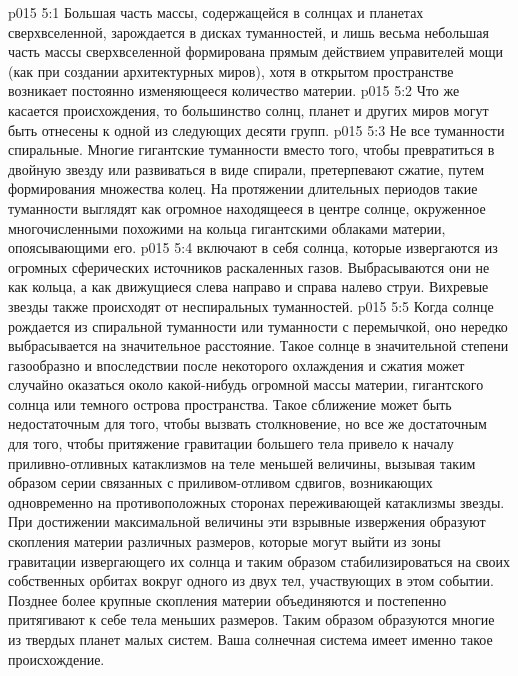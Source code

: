 \vs p015 5:1 Большая часть массы, содержащейся в солнцах и планетах сверхвселенной, зарождается в дисках туманностей, и лишь весьма небольшая часть массы сверхвселенной формирована прямым действием управителей мощи (как при создании архитектурных миров), хотя в открытом пространстве возникает постоянно изменяющееся количество материи.
\vs p015 5:2 Что же касается происхождения, то большинство солнц, планет и других миров могут быть отнесены к одной из следующих десяти групп.
\vs p015 5:3 \bibnobreakspace {} Не все туманности спиральные. Многие гигантские туманности вместо того, чтобы превратиться в двойную звезду или развиваться в виде спирали, претерпевают сжатие, путем формирования множества колец. На протяжении длительных периодов такие туманности выглядят как огромное находящееся в центре солнце, окруженное многочисленными похожими на кольца гигантскими облаками материи, опоясывающими его.
\vs p015 5:4 \bibnobreakspace {} включают в себя солнца, которые извергаются из огромных сферических источников раскаленных газов. Выбрасываются они не как кольца, а как движущиеся слева направо и справа налево струи. Вихревые звезды также происходят от неспиральных туманностей.
\vs p015 5:5 \bibnobreakspace {} Когда солнце рождается из спиральной туманности или туманности с перемычкой, оно нередко выбрасывается на значительное расстояние. Такое солнце в значительной степени газообразно и впоследствии после некоторого охлаждения и сжатия может случайно оказаться около какой\hyp{}нибудь огромной массы материи, гигантского солнца или темного острова пространства. Такое сближение может быть недостаточным для того, чтобы вызвать столкновение, но все же достаточным для того, чтобы притяжение гравитации большего тела привело к началу приливно\hyp{}отливных катаклизмов на теле меньшей величины, вызывая таким образом серии связанных с приливом\hyp{}отливом сдвигов, возникающих одновременно на противоположных сторонах переживающей катаклизмы звезды. При достижении максимальной величины эти взрывные извержения образуют скопления материи различных размеров, которые могут выйти из зоны гравитации извергающего их солнца и таким образом стабилизироваться на своих собственных орбитах вокруг одного из двух тел, участвующих в этом событии. Позднее более крупные скопления материи объединяются и постепенно притягивают к себе тела меньших размеров. Таким образом образуются многие из твердых планет малых систем. Ваша солнечная система имеет именно такое происхождение.
